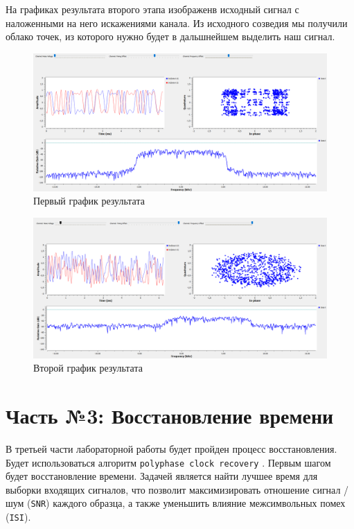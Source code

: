 \documentclass[a4paper]{article}
\begin{document}
           На графиках результата второго этапа изображенв исходный сигнал с наложенными на него искажениями канала. Из исходного созведия мы получили облако точек, из которого нужно будет в дальшнейшем выделить наш сигнал.
           
           \begin{figure}[H]
                \centering
                \includegraphics[width=\textwidth]{ex_2_2.png}
                \caption{Первый график результата}
                \label{fig:ex_2_2}
            \end{figure}
           
           \begin{figure}[H]
                \centering
                \includegraphics[width=\textwidth]{ex_2_3.png}
                \caption{Второй график результата}
                \label{fig:ex_2_3}
            \end{figure}
           
    \newpage
        \section{Часть №3: Восстановление времени}
           В третьей части лабораторной работы будет пройден процесс восстановления. Будет использоваться алгоритм \texttt{polyphase clock recovery} . Первым шагом будет восстановление времени. Задачей является найти лучшее время для выборки входящих сигналов, что позволит максимизировать отношение сигнал / шум (\texttt{SNR}) каждого образца, а также уменьшить влияние межсимвольных помех (\texttt{ISI}).
           
\end{document}
